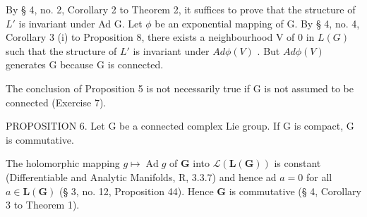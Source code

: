 By § 4, no. 2, Corollary 2 to Theorem 2, it suffices to prove that the structure of \(L'\) is invariant under Ad G. Let \(\phi\) be an exponential mapping of G. By § 4, no. 4, Corollary 3 (i) to Proposition 8, there exists a neighbourhood V of 0 in \(L(G)\) such that the structure of \(L'\) is invariant under \(Ad\phi(V)\) . But \(Ad\phi(V)\) generates G because G is connected.

The conclusion of Proposition 5 is not necessarily true if G is not assumed to be connected (Exercise 7).

PROPOSITION 6. Let G be a connected complex Lie group. If G is compact, G is commutative.

The holomorphic mapping \(g \mapsto \operatorname{Ad} g\) of \(\mathbf{G}\) into \(\mathcal{L}(\mathbf{L}(\mathbf{G}))\) is constant (Differentiable and Analytic Manifolds, R, 3.3.7) and hence ad \(a = 0\) for all \(a \in \mathbf{L}(\mathbf{G})\) (§ 3, no. 12, Proposition 44). Hence \(\mathbf{G}\) is commutative (§ 4, Corollary 3 to Theorem 1).

